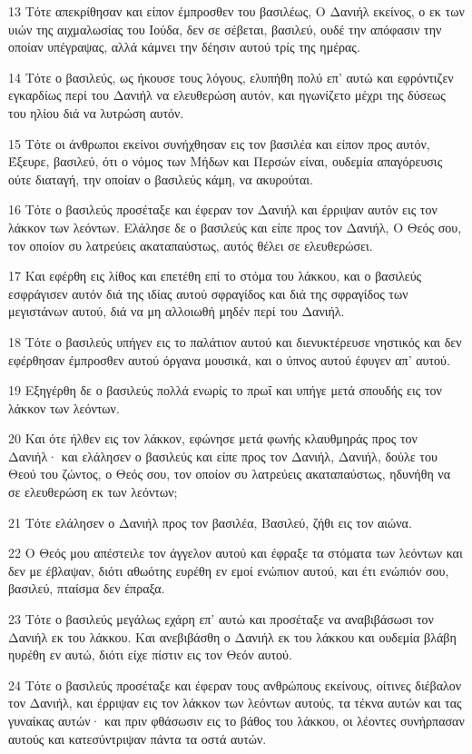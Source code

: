 \par 13 Τότε απεκρίθησαν και είπον έμπροσθεν του βασιλέως, Ο Δανιήλ εκείνος, ο εκ των υιών της αιχμαλωσίας του Ιούδα, δεν σε σέβεται, βασιλεύ, ουδέ την απόφασιν την οποίαν υπέγραψας, αλλά κάμνει την δέησιν αυτού τρίς της ημέρας.
\par 14 Τότε ο βασιλεύς, ως ήκουσε τους λόγους, ελυπήθη πολύ επ' αυτώ και εφρόντιζεν εγκαρδίως περί του Δανιήλ να ελευθερώση αυτόν, και ηγωνίζετο μέχρι της δύσεως του ηλίου διά να λυτρώση αυτόν.
\par 15 Τότε οι άνθρωποι εκείνοι συνήχθησαν εις τον βασιλέα και είπον προς αυτόν, Έξευρε, βασιλεύ, ότι ο νόμος των Μήδων και Περσών είναι, ουδεμία απαγόρευσις ούτε διαταγή, την οποίαν ο βασιλεύς κάμη, να ακυρούται.
\par 16 Τότε ο βασιλεύς προσέταξε και έφεραν τον Δανιήλ και έρριψαν αυτόν εις τον λάκκον των λεόντων. Ελάλησε δε ο βασιλεύς και είπε προς τον Δανιήλ, Ο Θεός σου, τον οποίον συ λατρεύεις ακαταπαύστως, αυτός θέλει σε ελευθερώσει.
\par 17 Και εφέρθη εις λίθος και επετέθη επί το στόμα του λάκκου, και ο βασιλεύς εσφράγισεν αυτόν διά της ιδίας αυτού σφραγίδος και διά της σφραγίδος των μεγιστάνων αυτού, διά να μη αλλοιωθή μηδέν περί του Δανιήλ.
\par 18 Τότε ο βασιλεύς υπήγεν εις το παλάτιον αυτού και διενυκτέρευσε νηστικός και δεν εφέρθησαν έμπροσθεν αυτού όργανα μουσικά, και ο ύπνος αυτού έφυγεν απ' αυτού.
\par 19 Εξηγέρθη δε ο βασιλεύς πολλά ενωρίς το πρωΐ και υπήγε μετά σπουδής εις τον λάκκον των λεόντων.
\par 20 Και ότε ήλθεν εις τον λάκκον, εφώνησε μετά φωνής κλαυθμηράς προς τον Δανιήλ· και ελάλησεν ο βασιλεύς και είπε προς τον Δανιήλ, Δανιήλ, δούλε του Θεού του ζώντος, ο Θεός σου, τον οποίον συ λατρεύεις ακαταπαύστως, ηδυνήθη να σε ελευθερώση εκ των λεόντων;
\par 21 Τότε ελάλησεν ο Δανιήλ προς τον βασιλέα, Βασιλεύ, ζήθι εις τον αιώνα.
\par 22 Ο Θεός μου απέστειλε τον άγγελον αυτού και έφραξε τα στόματα των λεόντων και δεν με έβλαψαν, διότι αθωότης ευρέθη εν εμοί ενώπιον αυτού, και έτι ενώπιόν σου, βασιλεύ, πταίσμα δεν έπραξα.
\par 23 Τότε ο βασιλεύς μεγάλως εχάρη επ' αυτώ και προσέταξε να αναβιβάσωσι τον Δανιήλ εκ του λάκκου. Και ανεβιβάσθη ο Δανιήλ εκ του λάκκου και ουδεμία βλάβη ηυρέθη εν αυτώ, διότι είχε πίστιν εις τον Θεόν αυτού.
\par 24 Τότε ο βασιλεύς προσέταξε και έφεραν τους ανθρώπους εκείνους, οίτινες διέβαλον τον Δανιήλ, και έρριψαν εις τον λάκκον των λεόντων αυτούς, τα τέκνα αυτών και τας γυναίκας αυτών· και πριν φθάσωσιν εις το βάθος του λάκκου, οι λέοντες συνήρπασαν αυτούς και κατεσύντριψαν πάντα τα οστά αυτών.
